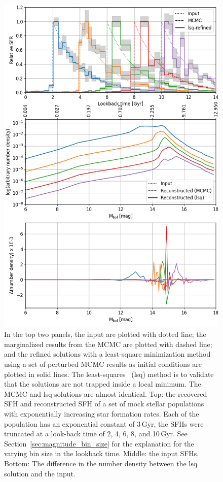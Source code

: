 \documentclass[fleqn,usenatbib]{mnras}
\begin{document}
\begin{figure}
  \includegraphics[width=\columnwidth]{figures/fig_01_exponential_decay_wdlf.png}
  \caption{In the top two panels, the input are plotted with dotted line; the
  marginalized results from the MCMC are plotted with dashed line; and the
  refined solutions with a least-square minimization method using a set of
  perturbed MCMC results as initial conditions are plotted in solid lines.
  The least-squares ~(lsq) method is to validate that the solutions are not
  trapped inside a local minimum. The MCMC and lsq solutions are almost
  identical. Top: the recovered SFH and reconstructed SFH of a set of mock
  stellar populations with exponentially increasing star formation rates. Each
  of the population has an exponential constant of 3\,Gyr, the SFHs were
  truncated at a look-back time of 2, 4, 6, 8, and 10\,Gyr. See 
  Section~\ref{sec:magnitude_bin_size} for the explanation for the varying bin
  size in the lookback time. Middle: the input SFHs. Bottom: The difference
  in the number density between the lsq solution and the input.}
  \label{fig:exponential_sfh}
\end{figure}
\end{document}

